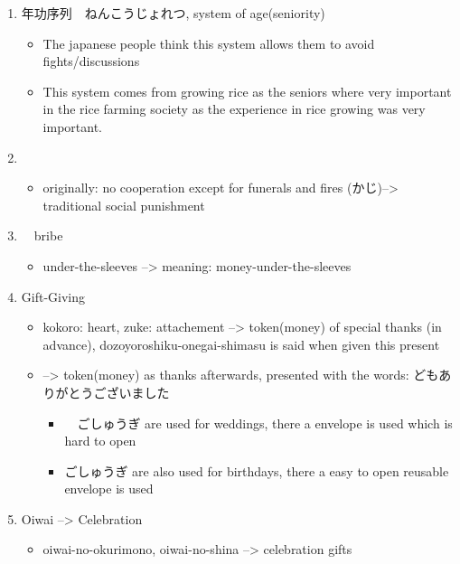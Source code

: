 \documentclass{article}
\newcommand\tabni[1][0.2cm]{\hspace*{#1}}
\begin{document}
\begin{enumerate}[itemsep=-6pt]
\item 年功序列　ねんこうじょれつ, system of age(seniority)	
\begin{itemize}%
\item The japanese people think this system allows them to avoid fights/discussions 
\item This system comes from growing rice as the seniors where very important in the rice farming society as the experience in rice growing was very important. \\
\end{itemize}
\item {} 
\begin{itemize}%
\item originally: no cooperation except for funerals and fires (かじ)--> traditional social punishment \\
\end{itemize}
\item {}　bribe
\begin{itemize}%
\item {} under-the-sleeves --> meaning: money-under-the-sleeves \\
\end{itemize}
\item Gift-Giving
\begin{itemize}
\item {} kokoro: heart, zuke: attachement	--> token(money) of special thanks (in advance),	dozoyoroshiku-onegai-shimasu is said when given this present
\item {} --> token(money) as thanks afterwards, presented with the words: どもありがとうございました
\begin{itemize}%
\item　ごしゅうぎ are used for weddings, there a envelope is used which is hard to open
\item ごしゅうぎ are also used for birthdays, there a easy to open reusable envelope is used \\
\end{itemize}
\end{itemize}
\item {} \tabni Oiwai --> Celebration
\begin{itemize}%
\item oiwai-no-okurimono, oiwai-no-shina --> celebration gifts

\end{itemize}
\end{enumerate}
\end{document}
